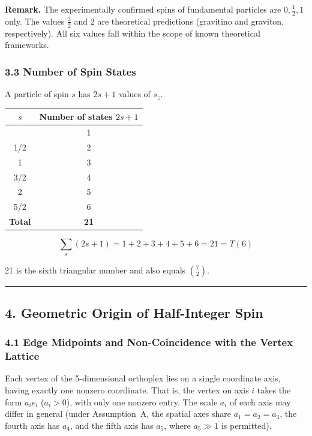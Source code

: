 \documentclass[a4paper,11pt]{article}
\newcounter{none}
\begin{document}
\textbf{Remark.} The experimentally confirmed spins of fundamental particles are $0, \frac{1}{2}, 1$ only. The values $\frac{3}{2}$ and $2$ are theoretical predictions (gravitino and graviton, respectively). All six values fall within the scope of known theoretical frameworks.

\subsubsection*{3.3 Number of Spin States}

A particle of spin $s$ has $2s + 1$ values of $s_z$.

{\def\LTcaptype{none}
\begin{longtable}[]{@{}cc@{}}
\toprule
$s$ & Number of states $2s+1$ \\
\midrule
\endhead
\bottomrule
\endlastfoot
0 & 1 \\
1/2 & 2 \\
1 & 3 \\
3/2 & 4 \\
2 & 5 \\
5/2 & 6 \\
\textbf{Total} & \textbf{21} \\
\end{longtable}
}

\[\sum_{s} (2s+1) = 1 + 2 + 3 + 4 + 5 + 6 = 21 = T(6)\]

21 is the sixth triangular number and also equals $\binom{7}{2}$.

\begin{center}\rule{0.5\linewidth}{0.5pt}\end{center}

\subsection*{4. Geometric Origin of Half-Integer Spin}

\subsubsection*{4.1 Edge Midpoints and Non-Coincidence with the Vertex Lattice}

Each vertex of the 5-dimensional orthoplex lies on a single coordinate axis, having exactly one nonzero coordinate. That is, the vertex on axis $i$ takes the form $a_i e_i$ ($a_i > 0$), with only one nonzero entry. The scale $a_i$ of each axis may differ in general (under Assumption~A, the spatial axes share $a_1 = a_2 = a_3$, the fourth axis has $a_4$, and the fifth axis has $a_5$, where $a_5 \gg 1$ is permitted).
\end{document}
